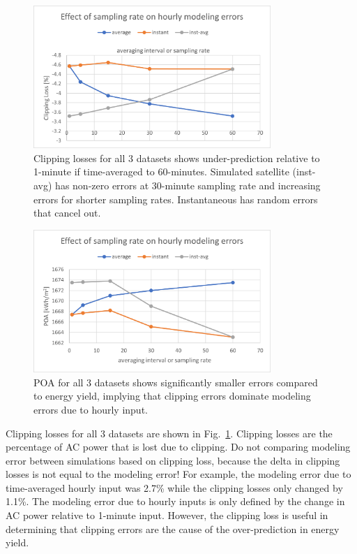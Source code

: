 \documentclass[conference]{IEEEtran}
\begin{document}
\begin{figure}[htbp]
\centerline{\includegraphics[width=9cm]{NIST_clipping_loss.png}}
\caption{Clipping losses for all 3 datasets shows under-prediction relative to 1-minute if time-averaged to 60-minutes. Simulated satellite (inst-avg) has non-zero errors at 30-minute sampling rate and increasing errors for shorter sampling rates. Instantaneous has random errors that cancel out.}
\label{fig:NIST-clipping-loss}
\end{figure}

\begin{figure}[htbp]
\centerline{\includegraphics[width=9cm]{NIST_POA.png}}
\caption{POA for all 3 datasets shows significantly smaller errors compared to energy yield, implying that clipping errors dominate modeling errors due to hourly input.}
\label{fig:NIST-POA}
\end{figure}

Clipping losses for all 3 datasets are shown in Fig.~\ref{fig:NIST-clipping-loss}. Clipping losses are the percentage of AC power that is lost due to clipping. Do not comparing modeling error between simulations based on clipping loss, because the delta in clipping losses is not equal to the modeling error! For example, the modeling error due to time-averaged hourly input was 2.7\% while the clipping losses only changed by 1.1\%. The modeling error due to hourly inputs is only defined by the change in AC power relative to 1-minute input. However, the clipping loss is useful in determining that clipping errors are the cause of the over-prediction in energy yield.
\end{document}
